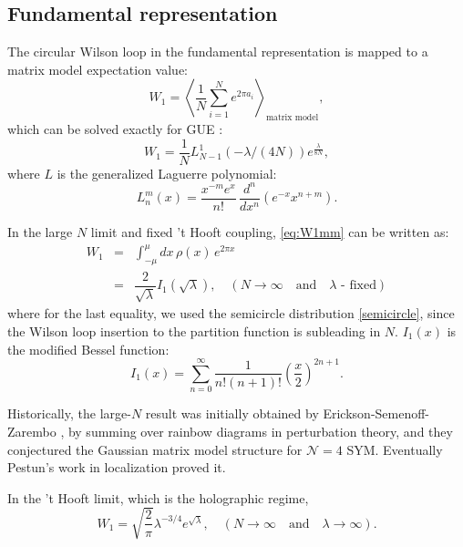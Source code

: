 \subsection{Fundamental representation}
The circular Wilson loop in the fundamental representation is mapped to a matrix model expectation value:
\begin{equation}\label{eq:W1mm}
 W_1 = \left< \dfrac{1}{N}\sum_{i=1}^N e^{2\pi a_i} \right>_\text{matrix model},
\end{equation}
which can be solved exactly for GUE \cite{Drukker:2000rr}:
\begin{equation}
 W_1 = \dfrac{1}{N} L_{N-1}^1 (-\lambda/(4N)) e^\frac{\lambda}{8N},
\end{equation}
where $L$ is the generalized Laguerre polynomial:
\begin{equation}
 L_n^m(x)=\dfrac{x^{-m}  e^x}{n!}\,  \dfrac{d^n}{dx^n}(e^{-x} x^{n+m}).
\end{equation}

In the large $N$ limit and fixed 't Hooft coupling, 
\eqref{eq:W1mm} can be written as:
\begin{eqnarray}
 W_1 &=& \int_{-\mu}^{\mu} dx\, \rho(x) \,e^{2\pi x} \label{eq:W1continuous} \\
     &=& \dfrac{2}{\sqrt{\lambda}} I_1 (\sqrt{\lambda}), \quad (N\rightarrow \infty \quad \text{and} \quad \lambda \text{ - fixed})
\end{eqnarray}
where for the last equality, we used the semicircle distribution \eqref{semicircle},
since the Wilson loop insertion to the partition function is subleading in $N$.
$I_1(x)$ is the modified Bessel function:
\begin{equation}
 I_1(x) = \sum_{n=0}^\infty  \dfrac{1}{n! (n+1)!} \left(\dfrac{x}{2}\right)^{2n+1}.
\end{equation}


Historically, the large-$N$ result was initially obtained by Erickson-Semenoff-Zarembo \cite{Erickson:2000af},
by summing over rainbow diagrams in perturbation theory, and they conjectured the Gaussian matrix model structure for $\mathcal{N}=4$ SYM.
Eventually Pestun's work in localization \cite{Pestun:2007rz} proved it.



In the 't Hooft limit, which is the holographic regime, 
\begin{equation}\label{W1holographic}
 W_1 = \sqrt{\frac{2}{\pi}} \lambda^{-3/4} e^{\sqrt{\lambda}}, 
 \quad (N\rightarrow \infty \quad \text{and} \quad \lambda \rightarrow \infty).
\end{equation}

